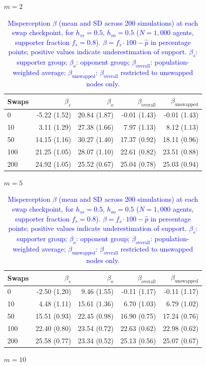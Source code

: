\begin{table}[H]
\centering
\caption{\textcolor{blue}{Misperception $\beta$ (mean and SD across 200 simulations) at each swap checkpoint, for $h_{ss} = 0.5$, $h_{oo} = 0.5$ ($N = 1{,}000$ agents, supporter fraction $f_s = 0.8$). $\beta = f_s \cdot 100 - \hat{p}$ in percentage points; positive values indicate underestimation of support. $\beta_s$: supporter group; $\beta_o$: opponent group; $\beta_{\mathrm{overall}}$: population-weighted average; $\beta_{\mathrm{unswapped}}$: $\beta_{\mathrm{overall}}$ restricted to unswapped nodes only.}}
\label{tab:subset_fs08_hss500_hoo500}
\par\medskip
\noindent\textit{$m = 2$}\\[2pt]
\begin{tabular}{l rrrr}
\toprule
Swaps & $\beta_s$ & $\beta_o$ & $\beta_{\mathrm{overall}}$ & $\beta_{\mathrm{unswapped}}$ \\
\midrule
0 & -5.22 (1.52) & 20.84 (1.87) & -0.01 (1.43) & -0.01 (1.43) \\
10 & 3.11 (1.29) & 27.38 (1.66) & 7.97 (1.13) & 8.12 (1.13) \\
50 & 14.15 (1.16) & 30.27 (1.40) & 17.37 (0.92) & 18.11 (0.96) \\
100 & 21.25 (1.05) & 28.07 (1.10) & 22.61 (0.82) & 23.51 (0.88) \\
200 & 24.92 (1.05) & 25.52 (0.67) & 25.04 (0.78) & 25.03 (0.94) \\
\bottomrule
\end{tabular}
\par\medskip
\noindent\textit{$m = 5$}\\[2pt]
\begin{tabular}{l rrrr}
\toprule
Swaps & $\beta_s$ & $\beta_o$ & $\beta_{\mathrm{overall}}$ & $\beta_{\mathrm{unswapped}}$ \\
\midrule
0 & -2.50 (1.20) & 9.46 (1.55) & -0.11 (1.17) & -0.11 (1.17) \\
10 & 4.48 (1.11) & 15.61 (1.36) & 6.70 (1.03) & 6.79 (1.02) \\
50 & 15.51 (0.93) & 22.45 (0.98) & 16.90 (0.75) & 17.24 (0.76) \\
100 & 22.40 (0.80) & 23.54 (0.72) & 22.63 (0.62) & 22.98 (0.62) \\
200 & 25.58 (0.77) & 23.34 (0.52) & 25.13 (0.56) & 25.07 (0.67) \\
\bottomrule
\end{tabular}
\par\medskip
\noindent\textit{$m = 10$}\\[2pt]

\end{table}
